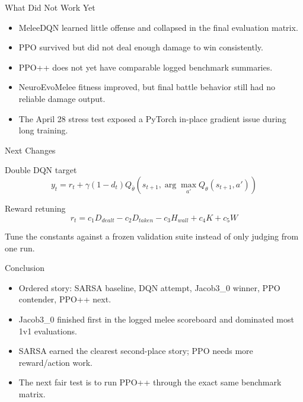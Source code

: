 \documentclass[12pt,aspectratio=169]{beamer}
\begin{document}
\begin{frame}{What Did Not Work Yet}
\begin{itemize}
  \item MeleeDQN learned little offense and collapsed in the final evaluation matrix.
  \item PPO survived but did not deal enough damage to win consistently.
  \item PPO++ does not yet have comparable logged benchmark summaries.
  \item NeuroEvoMelee fitness improved, but final battle behavior still had no reliable damage output.
  \item The April 28 stress test exposed a PyTorch in-place gradient issue during long training.
\end{itemize}
\end{frame}

\begin{frame}{Next Changes}
\begin{block}{Double DQN target}
\[
y_t=r_t+\gamma(1-d_t)Q_{\bar\theta}
\left(s_{t+1},\arg\max_{a'}Q_\theta(s_{t+1},a')\right)
\]
\end{block}

\begin{block}{Reward retuning}
\[
r_t = c_1D_{dealt} - c_2D_{taken} - c_3H_{wall}
+ c_4K + c_5W
\]
\end{block}

\small Tune the constants against a frozen validation suite instead of only judging from one run.
\end{frame}

\begin{frame}{Conclusion}
\begin{itemize}
  \item Ordered story: SARSA baseline, DQN attempt, Jacob3\_0 winner, PPO contender, PPO++ next.
  \item Jacob3\_0 finished first in the logged melee scoreboard and dominated most 1v1 evaluations.
  \item SARSA earned the clearest second-place story; PPO needs more reward/action work.
  \item The next fair test is to run PPO++ through the exact same benchmark matrix.
\end{itemize}
\end{frame}
\end{document}
